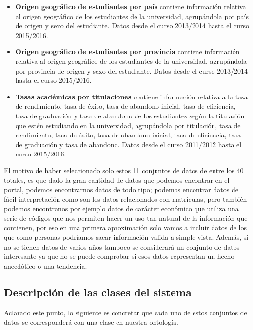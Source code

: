 \begin{itemize}
	\item \textbf{Origen geográfico de estudiantes por país} contiene información relativa al origen geográfico de los estudiantes de la universidad, agrupándola por país de origen y sexo del estudiante. Datos desde el curso 2013/2014 hasta el curso 2015/2016.
	\item \textbf{Origen geográfico de estudiantes por provincia} contiene información relativa al origen geográfico de los estudiantes de la universidad, agrupándola por provincia de origen y sexo del estudiante. Datos desde el curso 2013/2014 hasta el curso 2015/2016.
	\item \textbf{Tasas académicas por titulaciones} contiene información relativa a la tasa de rendimiento, tasa de éxito, tasa de abandono inicial, tasa de eficiencia, tasa de graduación y tasa de abandono de los estudiantes según la titulación que estén estudiando en la universidad, agrupándola por titulación, tasa de rendimiento, tasa de éxito, tasa de abandono inicial, tasa de eficiencia, tasa de graduación y tasa de abandono. Datos desde el curso 2011/2012 hasta el curso 2015/2016.
\end{itemize}

El motivo de haber seleccionado solo estos 11 conjuntos de datos de entre los 40 totales, es que dado la gran cantidad de datos que podemos encontrar en el portal, podemos encontrarnos datos de todo tipo; podemos encontrar datos de fácil interpretación como son los datos relacionados con matrículas, pero también podemos encontranos por ejemplo datos de carácter económico que utiliza una serie de códigos que nos permiten hacer un uso tan natural de la información que contienen, por eso en una primera aproximación solo vamos a incluir datos de los que como personas podríamos sacar información válida a simple vista. Además, si no se tienen datos de varios años tampoco se considerará un conjunto de datos interesante ya que no se puede comprobar si esos datos representan un hecho anecdótico o una tendencia.

\newpage
\subsection{Descripción de las clases del sistema}

Aclarado este punto, lo siguiente es concretar que cada uno de estos conjuntos de datos se corresponderá con una clase en nuestra ontología.

